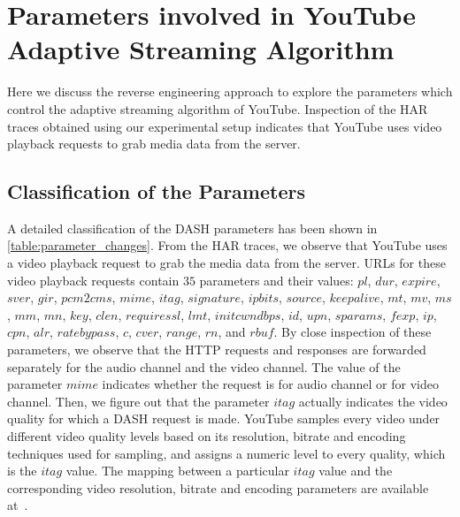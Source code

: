 \section{Parameters involved in YouTube Adaptive Streaming Algorithm}
\label{chap03s1:sec:parameters}
Here we discuss the reverse engineering approach to explore the parameters which control the adaptive streaming algorithm of YouTube. 
Inspection of the HAR traces obtained using our experimental setup indicates that YouTube uses video playback requests to grab media data from the server.
%
\subsection{Classification of the Parameters}
A detailed classification of the DASH parameters has been shown in \tbl\ref{table:parameter_changes}. From the HAR traces, we observe that YouTube uses a video playback request to grab the media data from the server. URLs for these video playback requests contain $35$ parameters and their values: $pl$, $dur$, $expire$, $sver$, $gir$, $pcm2cms$, $mime$, $itag$, $signature$, $ipbits$, $source$, $keepalive$, $mt$, $mv$, $ms$, $mm$, $mn$, $key$, $clen$, $requiressl$, $lmt$, $initcwndbps$, $id$, $upn$, $sparams$, $fexp$, $ip$, $cpn$, $alr$, $ratebypass$, $c$, $cver$, $range$, $rn$, and $rbuf$. By close inspection of these parameters, we observe that the HTTP requests and responses are forwarded separately for the audio channel and the video channel. The value of the parameter $mime$ indicates whether the request is for audio channel or for video channel. Then, we figure out that the parameter $itag$ actually indicates the video quality for which a DASH request is made. YouTube samples every video under different video quality levels based on its resolution, bitrate and encoding techniques used for sampling, and assigns a numeric level to every quality, which is the $itag$ value. The mapping between a particular $itag$ value and the corresponding video resolution, bitrate and encoding parameters are available at~\cite{itag}. 

